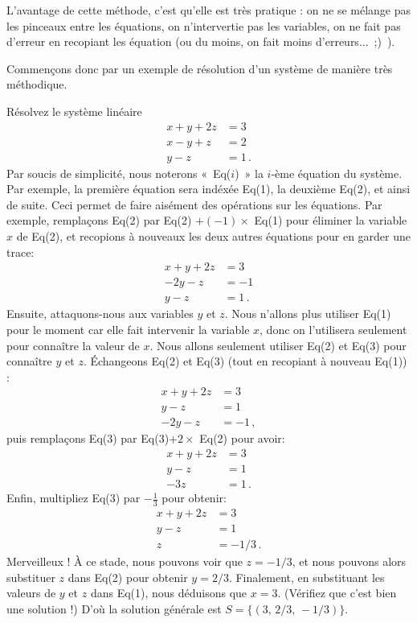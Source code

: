 L'avantage de cette méthode, c'est qu'elle est très pratique : on ne se mélange pas les pinceaux entre les équations, on n'intervertie pas les variables, on ne fait pas d'erreur en recopiant les équation (ou du moins, on fait moins d'erreurs...~;)~).

Commençons donc par un exemple de résolution d'un système de manière très méthodique. 
\begin{myexample}
Résolvez le système linéaire
\begin{align*}
x + y + 2z &= 3\\
x - y + z &= 2 \\
  y-z &=1\,.
\end{align*}
Par soucis de simplicit\'e, nous noterons «~Eq($i$)~» la $i$-ème équation du système. Par exemple, la premi\`ere \'equation sera ind\'ex\'ee Eq(1), la deuxi\`eme Eq(2), et ainsi de suite. Ceci permet de faire aisément des opérations sur les équations.
Par exemple, rempla\c{c}ons Eq(2) par Eq(2) $+ (-1)\times$ Eq(1) pour éliminer la variable $x$ de Eq(2), et recopions à nouveaux les deux autres équations pour en garder une trace:
\begin{align*}
 x + y + 2z &= 3\\
 - 2y - z &= -1\\
  y-z &=1\,.
\end{align*}
Ensuite, attaquons-nous aux variables $y$ et $z$.  Nous n'allons plus utiliser Eq(1) pour le moment car elle fait intervenir la variable $x$, donc on l'utilisera seulement pour connaître la valeur de $x$. Nous allons seulement utiliser Eq(2) et Eq(3) pour connaître $y$ et $z$. Échangeons Eq(2) et Eq(3) (tout en recopiant à nouveau Eq(1)) :
\begin{align*}
 x + y + 2z &= 3\\
  y-z &=1\\
- 2y - z &= -1\,, 
\end{align*}
puis remplaçons Eq(3) par Eq(3)$+2\times$ Eq(2) pour avoir:
\begin{align*}
  x + y + 2z &= 3\\
  y-z &=1\\
  -3 z &= 1\,.
\end{align*}
Enfin, multipliez Eq(3) par $-\frac13$ pour obtenir:
\begin{align*}
  x + y + 2z &= 3\\
  y-z &=1\\
  z &= -1/3 \,.
\end{align*}
Merveilleux !  À ce stade, nous pouvons voir que $z=-1/3$, et nous pouvons alors substituer $z$ dans Eq(2) pour obtenir $y=2/3$. Finalement, en substituant les valeurs de $y$ et $z$ dans Eq(1), nous déduisons que $x = 3$. (Vérifiez que c'est bien une solution !) D'où la solution générale est $S=\{(3,\,2/3,\, -1/3)\}$.
\end{myexample}

